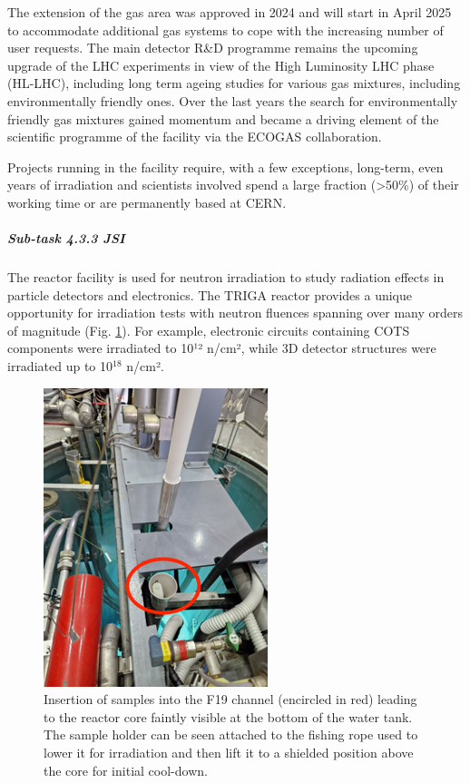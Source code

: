 The extension of the gas area was approved in 2024 and will start in April 2025 to accommodate additional gas systems to cope with the increasing number of user requests. The main detector R\&D programme remains the upcoming upgrade of the LHC experiments in view of the High Luminosity LHC phase (HL-LHC), including long term ageing studies for various gas mixtures, including environmentally friendly ones. 
Over the last years the search for environmentally friendly gas mixtures gained momentum 
and became a driving element of the scientific programme of the facility via the ECOGAS collaboration.

Projects running in the facility require, with a few exceptions, long-term, even years of irradiation and scientists involved spend a large fraction (>50\%) of their working time or are permanently based at CERN.

\subparagraph{Sub-task 4.3.3 JSI} \mbox{}

The reactor facility is used for neutron irradiation to study radiation effects in particle detectors and electronics. The TRIGA reactor provides a unique opportunity for irradiation tests with neutron fluences spanning over many orders of magnitude (Fig. \ref{fig:4.3.3}). For example, electronic circuits containing COTS components were irradiated to 10¹² n/cm², while 3D detector structures were irradiated up to 10$^{18}$ n/cm².

\begin{figure}[!h]
    \centering
    \includegraphics[width=0.6\linewidth]{image9.png}
    \caption{Insertion of samples into the F19 channel (encircled in red) leading to the reactor core faintly visible at the bottom of the water tank. The sample holder can be seen attached to the fishing rope used to lower it for irradiation and then lift it to a shielded position above the core for initial cool-down.}
    \label{fig:4.3.3}
\end{figure}

